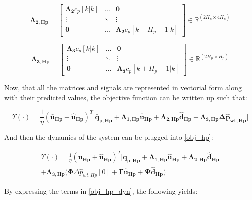 \begin{equation}
\bm{\Lambda_{2,Hp}} =
 \begin{bmatrix}
 \bm{\Lambda_2} c_p[k|k] & \hdots & \bm{0} \\
 \vdots & \ddots & \vdots\\
 \bm{0} & \hdots & \bm{\Lambda_2} c_p[k+H_p-1|k] 
 \end{bmatrix}
 \in \pmb{\mathbb{R}}^{(2 H_p \times 4 H_p)}
\end{equation} 


\begin{equation}
\bm{\Lambda_{3,Hp}} =
 \begin{bmatrix}
 \bm{\Lambda_3} c_p[k|k] & \hdots & \bm{0} \\
 \vdots & \ddots & \vdots\\
 \bm{0} & \hdots & \bm{\Lambda_3} c_p[k+H_p-1|k] 
 \end{bmatrix}
 \in \pmb{\mathbb{R}}^{(2 H_p \times H_p)}
\end{equation} 

Now, that all the matrices and signals are represented in vectorial form along with their predicted values, the objective function can be written up such that:

\begin{equation}
  \Upsilon(\cdot) = \frac{1}{\eta} ({\bm{\bar{u}}}_{\bm{{Hp}}} + {\bm{\hat{u}}}_{\bm{{Hp}}})^{T} \bigg[ {\bm{\bar{q}}}_{\bm{p,Hp}} + {\bm{\Lambda}}_{\bm{1,Hp}} {\bm{\hat{u}}}_{\bm{Hp}} + {\bm{\Lambda}}_{\bm{2,Hp}} {\bm{\hat{d}}}_{\bm{Hp}} 
  + {\bm{\Lambda}}_{\bm{3,Hp}} \bm{\Delta \hat{p}_{wt,Hp}} \bigg]
 \label{obj_hp}
\end{equation}

And then the dynamics of the system can be plugged into \eqref{obj_hp}:

\begin{equation}
\begin{aligned}
 \Upsilon(\cdot) = \frac{1}{\eta} ({\bm{\bar{u}}}_{\bm{{Hp}}} + {\bm{\hat{u}}}_{\bm{{Hp}}})^{T}  \bigg[ {\bm{\bar{q}}}_{\bm{p,Hp}} + {\bm{\Lambda}}_{\bm{1,Hp}} {\bm{\hat{u}}}_{\bm{Hp}} + {\bm{\Lambda}}_{\bm{2,Hp}} {\bm{\hat{d}}}_{\bm{Hp}} 
   \\ + {\bm{\Lambda}}_{\bm{3,Hp}} \bigg( \bm{\Phi} \Delta \hat{p}_{wt,Hp}[0] + \bm{\Gamma} \bm{\hat{u}}_{\bm{Hp}} + \bm{\Psi}\bm{\hat{d}}_{\bm{Hp}} \bigg) \bigg]
\end{aligned}
\label{obj_hp_dyn}
\end{equation}

By expressing the terms in \eqref{obj_hp_dyn}, the following yields:


